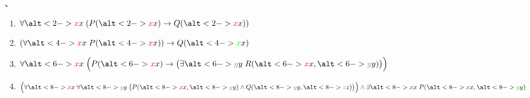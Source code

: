 \begin{frame}{}
  \begin{center}
  \end{center}

  \begin{exampleblock}{、}
    \begin{enumerate}[(1)]
      \setlength{\itemsep}{10pt}
      \item<1-> $\forall \alt<2->{\red{x}}{x}\; (P(\alt<2->{\red{x}}{x}) \to Q(\alt<2->{\red{x}}{x}))$
      \item<3-> $(\forall \alt<4->{\red{x}}{x}\; P(\alt<4->{\red{x}}{x})) \to Q(\alt<4->{\green{x}}{x})$
      \item<5-> $\forall \alt<6->{\red{x}}{x}\; \Big(P(\alt<6->{\red{x}}{x}) \to \big(\exists \alt<6->{\brown{y}}{y}\; R(\alt<6->{\red{x}}{x}, \alt<6->{\brown{y}}{y})\big)\Big)$
      \item<7-> $\Big(\forall \alt<8->{\red{x}}{x}\; \forall \alt<8->{\brown{y}}{y}\; \big(P(\alt<8->{\red{x}}{x}, \alt<8->{\brown{y}}{y})
        \land Q(\alt<8->{\brown{y}}{y}, \alt<8->{\green{z}}{z})\big)\Big) \land
        \exists \alt<8->{\violet{x}}{x}\; P(\alt<8->{\violet{x}}{x}, \alt<8->{\green{y}}{y})$
    \end{enumerate}
  \end{exampleblock}
\end{frame}

